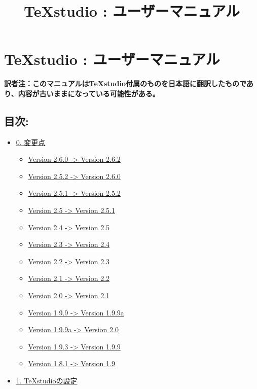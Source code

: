 \documentclass[]{book}
\title{TeXstudio : ユーザーマニュアル}
\author{}
\date{}
\begin{document}
\maketitle

\chapter{TeXstudio : ユーザーマニュアル}

\textbf{訳者注：このマニュアルはTeXstudio付属のものを日本語に翻訳したものであり、内容が古いままになっている可能性がある。}

\section{目次:}

\begin{itemize}
\item
  \hyperref[SECTIONNEW]{0. 変更点}

  \begin{itemize}
  \item
    \hyperref[SECTIONNEW262]{Version 2.6.0 -\textgreater{} Version
    2.6.2}
  \item
    \hyperref[SECTIONNEW260]{Version 2.5.2 -\textgreater{} Version
    2.6.0}
  \item
    \hyperref[SECTIONNEW252]{Version 2.5.1 -\textgreater{} Version
    2.5.2}
  \item
    \hyperref[SECTIONNEW251]{Version 2.5 -\textgreater{} Version 2.5.1}
  \item
    \hyperref[SECTIONNEW241]{Version 2.4 -\textgreater{} Version 2.5}
  \item
    \hyperref[SECTIONNEW24]{Version 2.3 -\textgreater{} Version 2.4}
  \item
    \hyperref[SECTIONNEW23]{Version 2.2 -\textgreater{} Version 2.3}
  \item
    \hyperref[SECTIONNEW22]{Version 2.1 -\textgreater{} Version 2.2}
  \item
    \hyperref[SECTIONNEW201]{Version 2.0 -\textgreater{} Version 2.1}
  \item
    \hyperref[SECTIONNEW199a]{Version 1.9.9 -\textgreater{} Version
    1.9.9a}
  \item
    \hyperref[SECTIONNEW20]{Version 1.9.9a -\textgreater{} Version 2.0}
  \item
    \hyperref[SECTIONNEW199]{Version 1.9.3 -\textgreater{} Version
    1.9.9}
  \item
    \hyperref[SECTIONNEW19]{Version 1.8.1 -\textgreater{} Version 1.9}
  \end{itemize}
\item
  \hyperref[SECTION0]{1. TeXstudioの設定}


\end{itemize}
\end{document}
